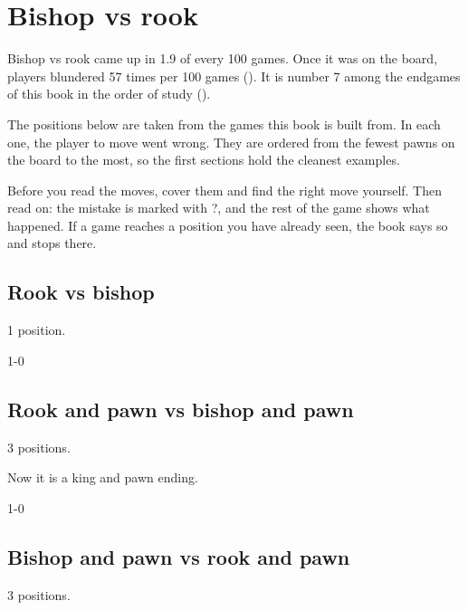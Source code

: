 \chapter{Bishop vs rook}\label{ch:bishop-vs-rook}
Bishop vs rook came up in 1.9 of every 100 games. Once it was on the board, players blundered 57 times per 100 games (). It is number 7 among the endgames of this book in the order of study ().

The positions below are taken from the games this book is built from. In each one, the player to move went wrong. They are ordered from the fewest pawns on the board to the most, so the first sections hold the cleanest examples.

Before you read the moves, cover them and find the right move yourself. Then read on: the mistake is marked with ?, and the rest of the game shows what happened. If a game reaches a position you have already seen, the book says so and stops there.


\section{Rook vs bishop}
1 position.


1-0\par
\section{Rook and pawn vs bishop and pawn}
3 positions.


Now it is a king and pawn ending.\par
{}
1-0\par
\section{Bishop and pawn vs rook and pawn}
3 positions.

